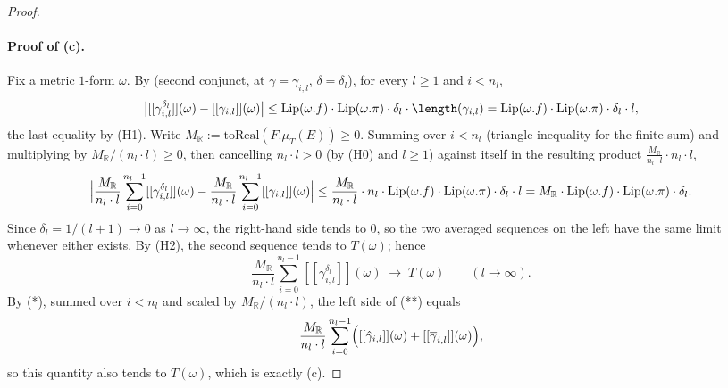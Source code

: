\begin{proof}
  \paragraph{Proof of (c).} Fix a metric $1$-form $\omega$. By 
  (second conjunct, at $\gamma=\gamma_{i,l}$, $\delta=\delta_l$), for every $l\ge1$ and $i<n_l$,
  \[
    \bigl|[[\gamma_{i,l}^{\delta_l}]](\omega) - [[\gamma_{i,l}]](\omega)\bigr|
    \le \mathrm{Lip}(\omega.f)\cdot\mathrm{Lip}(\omega.\pi)\cdot\delta_l\cdot\length(\gamma_{i,l})
    = \mathrm{Lip}(\omega.f)\cdot\mathrm{Lip}(\omega.\pi)\cdot\delta_l\cdot l
    ,
  \]
  the last equality by (H1). Write $M_{\mathbb R} := \mathrm{toReal}(F.\mu_T(E)) \ge 0$. Summing
  over $i<n_l$ (triangle inequality for the finite sum) and multiplying by
  $M_{\mathbb R}/(n_l\cdot l) \ge 0$, then cancelling $n_l\cdot l>0$ (by (H0) and $l\ge1$) against
  itself in the resulting product $\frac{M_{\mathbb R}}{n_l\cdot l}\cdot n_l\cdot l$,
  \[
    \Bigl|\frac{M_{\mathbb R}}{n_l\cdot l}\sum_{i=0}^{n_l-1}[[\gamma_{i,l}^{\delta_l}]](\omega)
      - \frac{M_{\mathbb R}}{n_l\cdot l}\sum_{i=0}^{n_l-1}[[\gamma_{i,l}]](\omega)\Bigr|
    \le \frac{M_{\mathbb R}}{n_l\cdot l}\cdot n_l\cdot \mathrm{Lip}(\omega.f)\cdot
      \mathrm{Lip}(\omega.\pi)\cdot\delta_l\cdot l
    = M_{\mathbb R}\cdot\mathrm{Lip}(\omega.f)\cdot\mathrm{Lip}(\omega.\pi)\cdot\delta_l
    .
  \]
  Since $\delta_l = 1/(l+1) \to 0$ as $l\to\infty$, the right-hand side tends to $0$, so the two
  averaged sequences on the left have the same limit whenever either exists. By (H2), the second
  sequence tends to $T(\omega)$; hence
  \[
    \frac{M_{\mathbb R}}{n_l\cdot l}\sum_{i=0}^{n_l-1}[[\gamma_{i,l}^{\delta_l}]](\omega)
    \;\longrightarrow\; T(\omega)
    \qquad(l\to\infty)
    . \tag{**}
  \]
  By (*), summed over $i<n_l$ and scaled by $M_{\mathbb R}/(n_l\cdot l)$, the left side of (**)
  equals
  \[
    \frac{M_{\mathbb R}}{n_l\cdot l}\sum_{i=0}^{n_l-1}\Bigl([[\hat\gamma_{i,l}]](\omega)+
      [[\overline\gamma_{i,l}]](\omega)\Bigr)
    ,
  \]
  so this quantity also tends to $T(\omega)$, which is exactly (c).


\end{proof}
